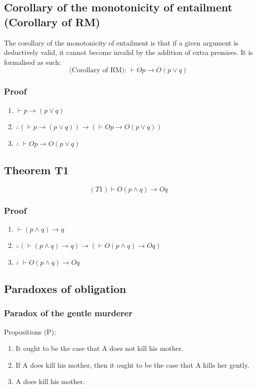 \documentclass[11pt]{article}
\begin{document}
\subsection{Corollary of the monotonicity of entailment (Corollary of RM)}
\label{sec:org06dd10f}
The corollary of the monotonicity of entailment is that if a given argument is deductively valid, it cannot become invalid by the addition of extra premises. It is formalised as such:
\[\text{(Corollary of RM): } \vdash Op \rightarrow O(p \vee q)\]
\subsubsection{Proof}
\label{sec:org0a45abe}
\begin{enumerate}
\item \(\vdash p \rightarrow (p \vee q)\)
\item \(\therefore (\vdash p \rightarrow (p \vee q)) \rightarrow (\vdash Op \rightarrow O(p \vee q))\)
\item \(\therefore \ \vdash Op \rightarrow O(p \vee q)\)
\end{enumerate}
\subsection{Theorem T1}
\label{sec:orged65cf5}
\[(T1) \vdash O(p \wedge q) \rightarrow Oq\]
\subsubsection{Proof}
\label{sec:org8644cb7}
\begin{enumerate}
\item \(\vdash (p \wedge q) \rightarrow q\)
\item \(\therefore (\vdash (p \wedge q) \rightarrow q) \rightarrow (\vdash O(p \wedge q) \rightarrow Oq)\)
\item \(\therefore \ \vdash O(p \wedge q) \rightarrow Oq\)
\end{enumerate}
\subsection{Paradoxes of obligation}
\label{sec:orgef12285}

\subsubsection{Paradox of the gentle murderer}
\label{sec:orgce917f5}
Propositions (P):
\begin{enumerate}
\item It ought to be the case that A does not kill his mother.
\item If A does kill his mother, then it ought to be the case that A kills her gently.
\item A does kill his mother.
\end{enumerate}
\end{document}
